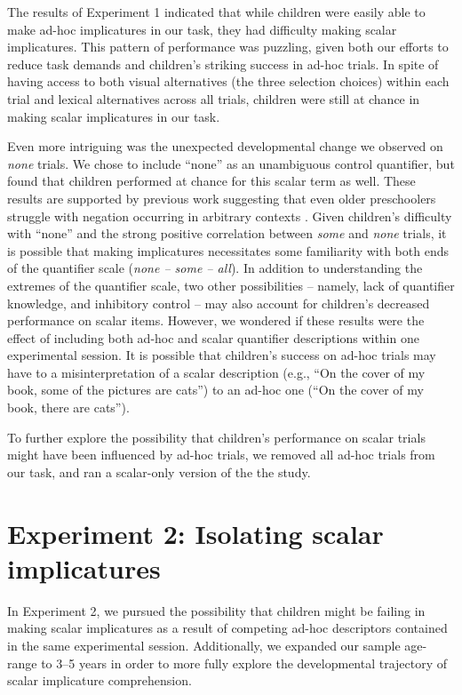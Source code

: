 \documentclass[man]{apa2}
\begin{document}
The results of Experiment 1 indicated that while children were easily able to make ad-hoc implicatures in our task, they had difficulty making scalar implicatures. This pattern of performance was puzzling, given both our efforts to reduce task demands and children's striking success in ad-hoc trials. In spite of having access to both visual alternatives (the three selection choices) within each trial and lexical alternatives across all trials, children were still at chance in making scalar implicatures in our task. 

Even more intriguing was the unexpected developmental change we observed on \textit{none} trials. We chose to include ``none'' as an unambiguous control quantifier, but found that children performed at chance for this scalar term as well. These results are supported by previous work suggesting that even older preschoolers struggle with negation occurring in arbitrary contexts \cite{nordmeyer2014}. Given children's difficulty with ``none'' and the strong positive correlation between \textit{some} and \textit{none} trials, it is possible that making implicatures necessitates some familiarity with both ends of the quantifier scale (\textit{none -- some -- all}). In addition to understanding the extremes of the quantifier scale, two other possibilities -- namely, lack of quantifier knowledge, and inhibitory control -- may also account for children's decreased performance on scalar items. However, we wondered if these results were the effect of including both ad-hoc and scalar quantifier descriptions within one experimental session. It is possible that children's success on ad-hoc trials may have to a misinterpretation of a scalar description (e.g., ``On the cover of my book, some of the pictures are cats'') to an ad-hoc one (``On the cover of my book, there are cats''). 

To further explore the possibility that children's performance on scalar trials might have been influenced by ad-hoc trials, we removed all ad-hoc trials from our task, and ran a scalar-only version of the the study.

\section{Experiment 2: Isolating scalar implicatures}
In Experiment 2, we pursued the possibility that children might be failing in making scalar implicatures as a result of competing ad-hoc descriptors contained in the same experimental session. Additionally, we expanded our sample age-range to 3--5 years in order to more fully explore the developmental trajectory of scalar implicature comprehension. 
\end{document}
